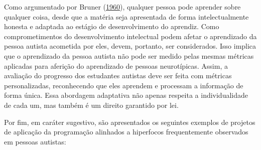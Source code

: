 \documentclass[
  12pt,
  a4paper,
]{article}
\begin{document}
Como argumentado por Bruner
(\protect\hyperlink{ref-bruner1960process}{1960}), qualquer pessoa pode
aprender sobre qualquer coisa, desde que a matéria seja apresentada de
forma intelectualmente honesta e adaptada ao estágio de desenvolvimento
do aprendiz. Como comprometimentos do desenvolvimento intelectual podem
afetar o aprendizado da pessoa autista acometida por eles, devem,
portanto, ser considerados. Isso implica que o aprendizado da pessoa
autista não pode ser medido pelas mesmas métricas aplicadas para
aferição do aprendizado de pessoas neurotípicas. Assim, a avaliação do
progresso dos estudantes autistas deve ser feita com métricas
personalizadas, reconhecendo que eles aprendem e processam a informação
de forma única. Essa abordagem adaptativa não apenas respeita a
individualidade de cada um, mas também é um direito garantido por lei.

Por fim, em caráter sugestivo, são apresentados os seguintes exemplos de
projetos de aplicação da programação alinhados a hiperfocos
frequentemente observados em pessoas autistas:
\end{document}
